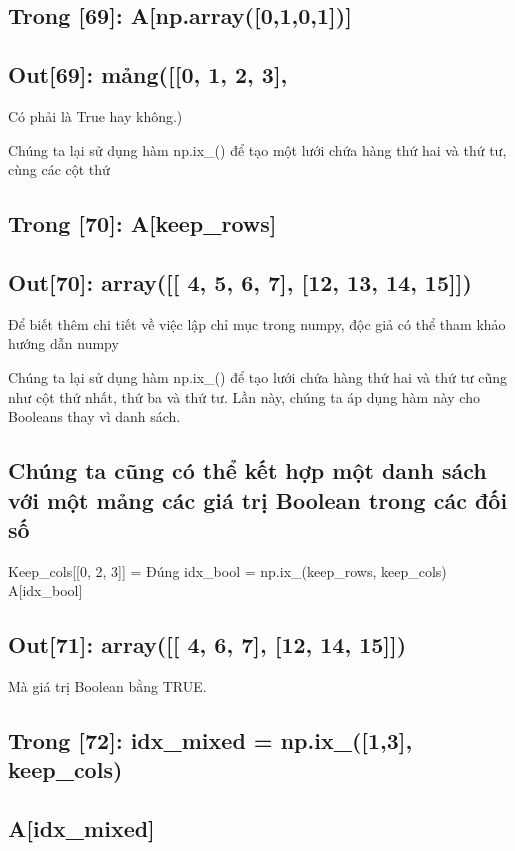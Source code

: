 \subsection{Trong [69]: A[np.array([0,1,0,1])]}

\subsection{Out[69]: mảng([[0, 1, 2, 3],}

Có phải là True hay không.)

Chúng ta lại sử dụng hàm np.ix\_() để tạo một lưới chứa hàng thứ hai và thứ tư, cùng các cột thứ

\subsection{Trong [70]: A[keep\_rows]}

\subsection{Out[70]: array([[ 4, 5, 6, 7], [12, 13, 14, 15]])}

Để biết thêm chi tiết về việc lập chỉ mục trong numpy, độc giả có thể tham khảo hướng dẫn numpy

Chúng ta lại sử dụng hàm np.ix\_() để tạo lưới chứa hàng thứ hai và thứ tư cũng như cột thứ nhất, thứ ba và thứ tư. Lần này, chúng ta áp dụng hàm này cho Booleans thay vì danh sách.

\subsection{Chúng ta cũng có thể kết hợp một danh sách với một mảng các giá trị Boolean trong các đối số}

Keep\_cols[[0, 2, 3]] = Đúng idx\_bool = np.ix\_(keep\_rows, keep\_cols) A[idx\_bool]

\subsection{Out[71]: array([[ 4, 6, 7], [12, 14, 15]])}

Mà giá trị Boolean bằng TRUE.

\subsection{Trong [72]: idx\_mixed = np.ix\_([1,3], keep\_cols)}

\subsection{A[idx\_mixed]}

